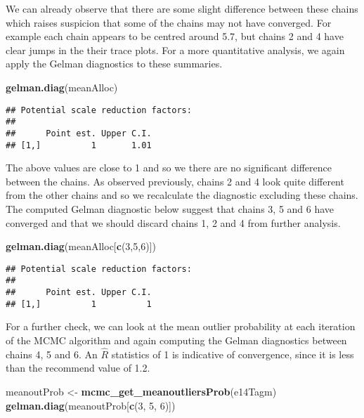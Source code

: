 \documentclass[]{article}
\newenvironment{Shaded}{\begin{snugshade}}{\end{snugshade}}
\newcommand{\KeywordTok}[1]{\textcolor[rgb]{0.13,0.29,0.53}{\textbf{{#1}}}}
\newcommand{\DecValTok}[1]{\textcolor[rgb]{0.00,0.00,0.81}{{#1}}}
\newcommand{\StringTok}[1]{\textcolor[rgb]{0.31,0.60,0.02}{{#1}}}
\newcommand{\NormalTok}[1]{{#1}}
\begin{document}
We can already observe that there are some slight difference between
these chains which raises suspicion that some of the chains may not have
converged. For example each chain appears to be centred around 5.7, but
chains 2 and 4 have clear jumps in the their trace plots. For a more
quantitative analysis, we again apply the Gelman diagnostics to these
summaries.

\begin{Shaded}
\begin{Highlighting}[]
\KeywordTok{gelman.diag}\NormalTok{(meanAlloc)}
\end{Highlighting}
\end{Shaded}

\begin{verbatim}
## Potential scale reduction factors:
## 
##      Point est. Upper C.I.
## [1,]          1       1.01
\end{verbatim}

The above values are close to 1 and so we there are no significant
difference between the chains. As observed previously, chains 2 and 4
look quite different from the other chains and so we recalculate the
diagnostic excluding these chains. The computed Gelman diagnostic below
suggest that chains 3, 5 and 6 have converged and that we should discard
chains 1, 2 and 4 from further analysis.

\begin{Shaded}
\begin{Highlighting}[]
\KeywordTok{gelman.diag}\NormalTok{(meanAlloc[}\KeywordTok{c}\NormalTok{(}\DecValTok{3}\NormalTok{,}\DecValTok{5}\NormalTok{,}\DecValTok{6}\NormalTok{)])}
\end{Highlighting}
\end{Shaded}

\begin{verbatim}
## Potential scale reduction factors:
## 
##      Point est. Upper C.I.
## [1,]          1          1
\end{verbatim}

For a further check, we can look at the mean outlier probability at each
iteration of the MCMC algorithm and again computing the Gelman
diagnostics between chains 4, 5 and 6. An \(\hat{R}\) statistics of 1 is
indicative of convergence, since it is less than the recommend value of
1.2.

\begin{Shaded}
\begin{Highlighting}[]
\NormalTok{meanoutProb <-}\StringTok{ }\KeywordTok{mcmc_get_meanoutliersProb}\NormalTok{(e14Tagm)}
\KeywordTok{gelman.diag}\NormalTok{(meanoutProb[}\KeywordTok{c}\NormalTok{(}\DecValTok{3}\NormalTok{, }\DecValTok{5}\NormalTok{, }\DecValTok{6}\NormalTok{)])}
\end{Highlighting}
\end{Shaded}
\end{document}

